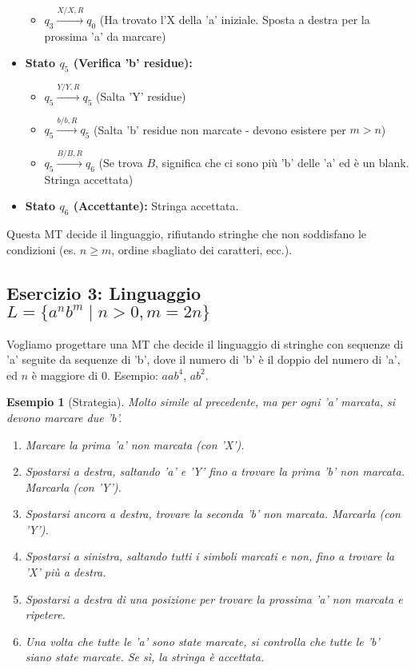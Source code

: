 \documentclass[a4paper, 11pt]{book} %
\newtheorem{example}[theorem]{Esempio}
\theoremstyle{definition}
\begin{document}
\begin{itemize}
\begin{itemize}
            \item $q_3 \xrightarrow{X / X, R} q_0$ (Ha trovato l'X della 'a' iniziale. Sposta a destra per la prossima 'a' da marcare)
        \end{itemize}
    \item \textbf{Stato $q_5$ (Verifica 'b' residue):}
        \begin{itemize}
            \item $q_5 \xrightarrow{Y / Y, R} q_5$ (Salta 'Y' residue)
            \item $q_5 \xrightarrow{b / b, R} q_5$ (Salta 'b' residue non marcate - devono esistere per $m>n$)
            \item $q_5 \xrightarrow{B / B, R} q_6$ (Se trova $B$, significa che ci sono più 'b' delle 'a' ed è un blank. Stringa accettata)
        \end{itemize}
    \item \textbf{Stato $q_6$ (Accettante):} Stringa accettata.
\end{itemize}
Questa MT decide il linguaggio, rifiutando stringhe che non soddisfano le condizioni (es. $n \ge m$, ordine sbagliato dei caratteri, ecc.).

\subsection{Esercizio 3: Linguaggio $L = \{a^n b^m \mid n > 0, m = 2n\}$}

Vogliamo progettare una MT che decide il linguaggio di stringhe con sequenze di 'a' seguite da sequenze di 'b', dove il numero di 'b' è il doppio del numero di 'a', ed $n$ è maggiore di $0$. Esempio: $aab^{4}$, $ab^{2}$.

\begin{example}[Strategia]
Molto simile al precedente, ma per ogni 'a' marcata, si devono marcare due 'b'.
\begin{enumerate}
    \item Marcare la prima 'a' non marcata (con 'X').
    \item Spostarsi a destra, saltando 'a' e 'Y' fino a trovare la prima 'b' non marcata. Marcarla (con 'Y').
    \item Spostarsi ancora a destra, trovare la seconda 'b' non marcata. Marcarla (con 'Y').
    \item Spostarsi a sinistra, saltando tutti i simboli marcati e non, fino a trovare la 'X' più a destra.
    \item Spostarsi a destra di una posizione per trovare la prossima 'a' non marcata e ripetere.
    \item Una volta che tutte le 'a' sono state marcate, si controlla che tutte le 'b' siano state marcate. Se sì, la stringa è accettata.
\end{enumerate}
\end{example}
\end{document}
